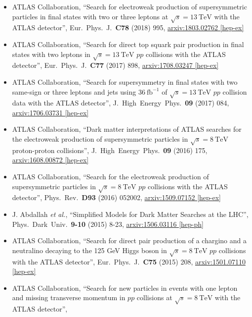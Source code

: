 \documentclass[a4paper,10pt]{article}
\begin{document}
\begin{itemize}
	\item ATLAS Collaboration,
	``Search for electroweak production of supersymmetric particles in final states with two or three leptons at $\sqrt{s}=13\ \mathrm{TeV}$ with the ATLAS detector'',
	Eur.\ Phys.\ J.\ {\bf C78} (2018) 995,
	\href{https://arxiv.org/abs/1803.02762}{arxiv:1803.02762 [hep-ex]}	
	\item ATLAS Collaboration,
	``Search for direct top squark pair production in final states with two leptons in $\sqrt{s}=13\ \mathrm{TeV}$ $pp$ collisions with the ATLAS detector'',
	Eur.\ Phys.\ J.\ {\bf C77} (2017) 898,
	\href{https://arxiv.org/abs/1708.03247}{arxiv:1708.03247 [hep-ex]}
	\item ATLAS Collaboration,
	``Search for supersymmetry in final states with two same-sign or three leptons and jets using $36\ \mathrm{fb}^{-1}$ of $\sqrt{s}=13\ \mathrm{TeV}$ $pp$ collision data with the ATLAS detector'',
	J.\ High\ Energy\ Phys.\ {\bf 09} (2017) 084,
	\href{https://arxiv.org/abs/1706.03731}{arxiv:1706.03731 [hep-ex]}
	\item ATLAS Collaboration,
	``Dark matter interpretations of ATLAS searches for the electroweak production of supersymmetric particles in $\sqrt{s} = 8\ \mathrm{TeV}$ proton-proton collisions'',
	J.\ High\ Energy\ Phys.\ {\bf 09} (2016) 175,
	\href{http://arxiv.org/abs/1608.00872}{arxiv:1608.00872 [hep-ex]}
	\item ATLAS Collaboration,
	``Search for the electroweak production of supersymmetric particles in $\sqrt{s} = 8\ \mathrm{TeV}$ $pp$ collisions with the ATLAS detector'',
	Phys.\ Rev.\ {\bf D93} (2016) 052002,
	\href{http://arxiv.org/abs/1509.07152}{arxiv:1509.07152 [hep-ex]}
	\item J. Abdallah {\it et al.},
	``Simplified Models for Dark Matter Searches at the LHC'',
	Phys.\ Dark\ Univ.\ {\bf 9-10} (2015) 8-23,
	\href{http://arxiv.org/abs/1506.03116}{arxiv:1506.03116 [hep-ph]}
	\item ATLAS Collaboration,
	``Search for direct pair production of a chargino and a neutralino decaying to the 125 GeV Higgs boson in $\sqrt{s} = 8\ \mathrm{TeV}$ $pp$ collisions with the ATLAS detector'',
	Eur.\ Phys.\ J.\ {\bf C75} (2015) 208,
	\href{http://arxiv.org/abs/1501.07110}{arxiv:1501.07110 [hep-ex]}
	\item ATLAS Collaboration,
	``Search for new particles in events with one lepton and missing transverse momentum in $pp$ collisions at $\sqrt{s} = 8\ \mathrm{TeV}$ with the ATLAS detector'',

\end{itemize}
\end{document}
